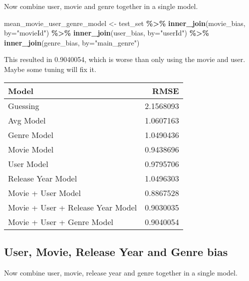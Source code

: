 \documentclass[
]{article}
\newenvironment{Shaded}{\begin{snugshade}}{\end{snugshade}}
\newcommand{\AttributeTok}[1]{\textcolor[rgb]{0.13,0.29,0.53}{#1}}
\newcommand{\FunctionTok}[1]{\textcolor[rgb]{0.13,0.29,0.53}{\textbf{#1}}}
\newcommand{\NormalTok}[1]{#1}
\newcommand{\OtherTok}[1]{\textcolor[rgb]{0.56,0.35,0.01}{#1}}
\newcommand{\SpecialCharTok}[1]{\textcolor[rgb]{0.81,0.36,0.00}{\textbf{#1}}}
\newcommand{\StringTok}[1]{\textcolor[rgb]{0.31,0.60,0.02}{#1}}
\begin{document}
Now combine user, movie and genre together in a single model.

\begin{Shaded}
\begin{Highlighting}[]
\NormalTok{mean\_movie\_user\_genre\_model }\OtherTok{\textless{}{-}}\NormalTok{ test\_set }\SpecialCharTok{\%\textgreater{}\%}
  \FunctionTok{inner\_join}\NormalTok{(movie\_bias, }\AttributeTok{by=}\StringTok{"movieId"}\NormalTok{) }\SpecialCharTok{\%\textgreater{}\%}
  \FunctionTok{inner\_join}\NormalTok{(user\_bias, }\AttributeTok{by=}\StringTok{"userId"}\NormalTok{) }\SpecialCharTok{\%\textgreater{}\%}
  \FunctionTok{inner\_join}\NormalTok{(genre\_bias, }\AttributeTok{by=}\StringTok{"main\_genre"}\NormalTok{)}
\end{Highlighting}
\end{Shaded}

This resulted in 0.9040054, which is worse than only using the movie and
user. Maybe some tuning will fix it.

\begin{tabular}{l|r}
\hline
Model & RMSE\\
\hline
Guessing & 2.1568093\\
\hline
Avg Model & 1.0607163\\
\hline
Genre Model & 1.0490436\\
\hline
Movie Model & 0.9438696\\
\hline
User Model & 0.9795706\\
\hline
Release Year Model & 1.0496303\\
\hline
Movie + User Model & 0.8867528\\
\hline
Movie + User + Release Year Model & 0.9030035\\
\hline
Movie + User + Genre Model & 0.9040054\\
\hline
\end{tabular}

\hypertarget{user-movie-release-year-and-genre-bias}{%
\subsection{User, Movie, Release Year and Genre
bias}\label{user-movie-release-year-and-genre-bias}}

Now combine user, movie, release year and genre together in a single
model.
\end{document}
